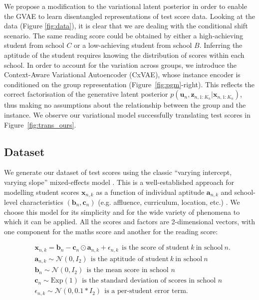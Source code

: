 \documentclass{article} %
\begin{document}
We propose a modification to the variational latent posterior in order to enable the GVAE to learn disentangled representations of test score data. Looking at the data (Figure \ref{fig:data}), it is clear that we are dealing with the conditional shift scenario. The same reading score could be obtained by either a high-achieving student from school $C$ or a low-achieving student from school $B$. Inferring the aptitude of the student requires knowing the distribution of scores within each school. In order to account for the variation across groups, we introduce the Context-Aware Variational Autoencoder (CxVAE), whose instance encoder is conditioned on the group representation (Figure~\ref{fig:pgm}-right). This reflects the correct factorisation of the generative latent posterior $p(\mathbf{u}_n, \mathbf{z}_{n,1:K_n} | \mathbf{x}_{n,1:K_n})$, thus making no assumptions about the relationship between the group and the instance. We observe our variational model successfully translating test scores in Figure~\ref{fig:trans_ours}.

\subsection{Dataset}
\label{sec:dataset}

We generate our dataset of test scores using the classic ``varying intercept, varying slope'' mixed-effects model \citep{Laird1982Random, Pinheiro2001MixedEffectsMI, Gelman2006Data}. This is a well-established approach for modelling student scores $\mathbf{x}_{n,k}$ as a function of individual aptitude $\mathbf{a}_{n,k}$ and school-level characteristics $(\mathbf{b}_n, \mathbf{c}_n)$ (e.g. affluence, curriculum, location, etc.) \citep{Raudenbush1995TheEO, Braun2006ComparingPS}. We choose this model for its simplicity and for the wide variety of phenomena to which it can be applied. All the scores and factors are 2-dimensional vectors, with one component for the maths score and another for the reading score:

\begin{equation} \begin{aligned} \label{eq:score}
& \mathbf{x}_{n,k} = \mathbf{b}_n - \mathbf{c}_n \odot \mathbf{a}_{n,k} + \epsilon_{n,k} ~~ \text{is the score of student} ~ k ~ \text{in school} ~ n.\\
& \mathbf{a}_{n,k} \sim \mathcal{N} (0,I_2) ~~ \text{is the aptitude of student} ~ k ~ \text{in school} ~ n\\
& \mathbf{b}_n \sim \mathcal{N} (0,I_2) ~~ \text{is the mean score in school } n\\
& \mathbf{c}_n \sim \mathrm{Exp} (1) ~~ \text{is the standard deviation of scores in school } n\\
& \epsilon_{n,k} \sim \mathcal{N} (0, 0.1 * I_2) ~~ \text{is a per-student error term.}
\end{aligned} \end{equation}
\end{document}
